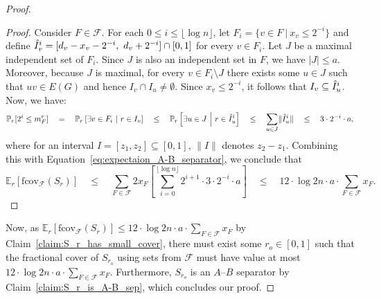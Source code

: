 \documentclass[11pt]{amsart}
\begin{document}
\begin{proof}
\begin{proof}
        Consider $F \in \mathcal{F}$. For each $0 \leq i \leq \lfloor \log n \rfloor$, let $F_i = \{v\in F\ |\ x_v\leq 2^{-i}\}$ and define $\Hat{I}_v^i = [d_v-x_v-2^{-i},\ d_v+2^{-i}]\cap [0,1]$ for every $v \in F_i$. Let $J$ be a maximal independent set of $F_i$. Since $J$ is also an independent set in $F$, we have $|J| \leq a$. Moreover, because $J$ is maximal, for every $v \in F_i\setminus J$ there exists some $u \in J$ such that $uv\in E(G)$ and hence $I_v \cap I_u \neq \emptyset$. Since $x_v \leq 2^{-i}$, it follows that $I_v \subseteq \Hat{I}_u^i$. Now, we have:
        $$
        \mathbb{P}_r[2^i \leq m_F^r] \quad
        = \quad \mathbb{P}_r\left[\exists v \in F_i\ \middle|\ r \in I_v \right] \quad
        \leq \quad \mathbb{P}_r\left[\exists u \in J\ \middle|\ r \in \Hat{I}_u^i \right] \quad
        \leq \quad \sum_{u \in J} \lVert \Hat{I}_u^i \rVert \quad
        \leq \quad  3 \cdot 2^{-i} \cdot a,
        $$
        where for an interval $I = [z_1, z_2] \subseteq [0,1]$, $\lVert I \rVert$ denotes $z_2 - z_1$. 
        Combining this with Equation~\ref{eq:expectaion_A-B_separator}, we conclude that 
        $$
        \mathbb{E}_r[\mathrm{fcov}_{\mathcal{F}}(S_r)] \quad
        \leq \quad \sum_{F \in \mathcal{F}} 2x_F \left[ \sum_{i = 0}^{\lfloor \log n \rfloor} 2^{i+1} \cdot 3 \cdot 2^{-i} \cdot a \right] \quad
        \leq \quad 12 \cdot \log 2n  \cdot a \cdot \sum_{F \in \mathcal{F}} x_F.
        $$
    \end{proof} 
    
    Now, as $\mathbb{E}_r[\mathrm{fcov}_{\mathcal{F}}(S_r)] \leq 12 \cdot \log 2n \cdot a \cdot \sum_{F \in \mathcal{F}} x_F$ by Claim~\ref{claim:S_r_has_small_cover}, there must exist some $r_o\in[0,1]$ such that the fractional cover of $S_{r_o}$ using sets from $\mathcal{F}$ must have value at most $12 \cdot \log 2n \cdot a \cdot \sum_{F \in \mathcal{F}} x_F$. Furthermore, $S_{r_o}$ is an $A$--$B$ separator by Claim~\ref{claim:S_r_is_A-B_sep}, which concludes our proof.
\end{proof}









\end{document}

